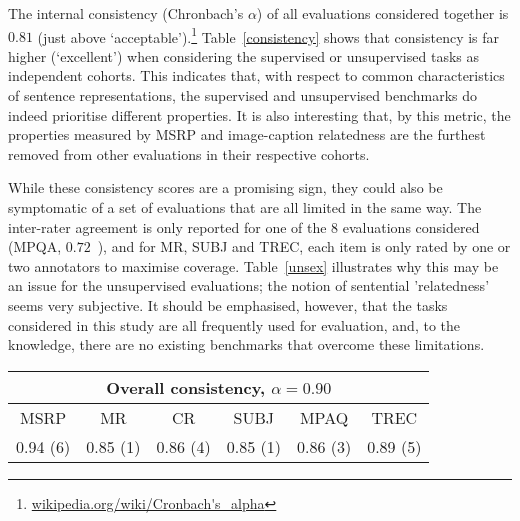 \vspace{5pt} The internal consistency (Chronbach's \(\alpha\)) of all evaluations considered together is \(0.81\) (just above `acceptable').\footnote{\url{wikipedia.org/wiki/Cronbach's_alpha}} Table~\ref{consistency} shows that consistency is far higher (`excellent') when considering the supervised or unsupervised tasks as independent cohorts. This indicates that, with respect to common characteristics of sentence representations, the supervised and unsupervised benchmarks do indeed prioritise different properties. It is also interesting that, by this metric, the properties measured by MSRP and image-caption relatedness are the furthest removed from other evaluations in their respective cohorts.

While these consistency scores are a promising sign, they could also be symptomatic of a set of evaluations that are all limited in the same way. The inter-rater agreement is only reported for one of the 8 evaluations considered (MPQA, \(0.72\)~\citep{wiebe2005annotating}), and for MR, SUBJ and TREC, each item is only rated by one or two annotators to maximise coverage. Table~\ref{unsex} illustrates why this may be an issue for the unsupervised evaluations; the notion of sentential 'relatedness' seems very subjective. It should be emphasised, however, that the tasks considered in this study are all frequently used for evaluation, and, to the knowledge, there are no existing benchmarks that overcome these limitations. 
\vspace{4mm}

\begin{table*}[h]
\renewcommand{\tabcolsep}{4.6pt}
\small
\begin{center}
      {
        \begin{tabular}{cccccc}
          \multicolumn{6}{c}{Overall consistency, \(\alpha = 0.90\)}\\
          \hline
                     MSRP & MR & CR & SUBJ & MPAQ & TREC  \\
                                          \footnotesize  0.94 (6) &	0.85 (1)	 &0.86 (4)	 &0.85 (1) &	0.86	(3) &0.89 (5) \\
                                          \hline
        \end{tabular}
    }
    \caption{\label{consistency} Internal consistency (Chronbach's \(\alpha\)) among supervised evaluations when individual benchmarks are left out of the cohort. Consistency rank is in parentheses (1 = most consistent with other evaluations).}
  \end{center}
\end{table*}

